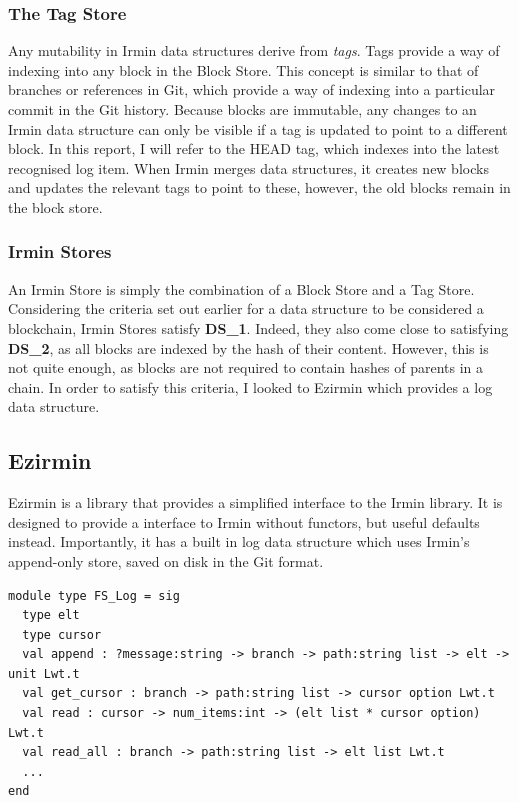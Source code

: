 \documentclass[12pt,a4paper,twoside,openright]{report}
\begin{document}
	\subsubsection*{The Tag Store}
	Any mutability in Irmin data structures derive from \textit{tags}.
	Tags provide a way of indexing into any block in the Block Store.
	This concept is similar to that of branches or references in Git, which provide a way of indexing into a particular commit in the Git history.
	Because blocks are immutable, any changes to an Irmin data structure can only be visible if a tag is updated to point to a different block. 
	In this report, I will refer to the HEAD tag, which indexes into the latest recognised log item.
	When Irmin merges data structures, it creates new blocks and updates the relevant tags to point to these, however, the old blocks remain in the block store.
	\subsubsection*{Irmin Stores}
	An Irmin Store is simply the combination of a Block Store and a Tag Store.
	Considering the criteria set out earlier for a data structure to be considered a blockchain, Irmin Stores satisfy \textbf{DS\_1}.
	Indeed, they also come close to satisfying \textbf{DS\_2}, as all blocks are indexed by the hash of their content. 
	However, this is not quite enough, as blocks are not required to contain hashes of parents in a chain.
	In order to satisfy this criteria, I looked to Ezirmin which provides a log data structure.

	\subsection{Ezirmin}
	Ezirmin is a library that provides a simplified interface to the Irmin library. 
	It is designed to provide a interface to Irmin without functors, but useful defaults instead. 
	Importantly, it has a built in log data structure which uses Irmin's append-only store, saved on disk in the Git format.

	\begin{lstlisting}[caption={Ezirmin Log},label={lst:ezirminlog}]
module type FS_Log = sig
  type elt 
  type cursor 
  val append : ?message:string -> branch -> path:string list -> elt -> unit Lwt.t
  val get_cursor : branch -> path:string list -> cursor option Lwt.t
  val read : cursor -> num_items:int -> (elt list * cursor option) Lwt.t
  val read_all : branch -> path:string list -> elt list Lwt.t
  ...
end
	\end{lstlisting}
\end{document}
